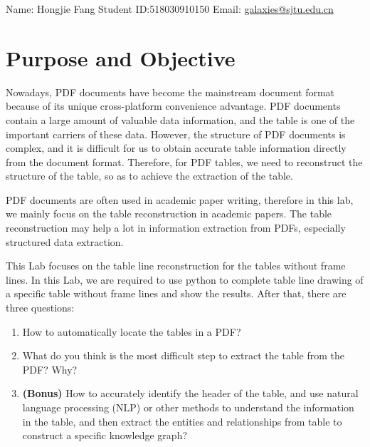 \documentclass[12pt, a4paper]{article}
\theoremstyle{definition}
\begin{document}
\noindent

\noindent{}
\begin{center}

Name: Hongjie Fang  \quad Student ID:518030910150 \quad Email: \href{mailto:galaxies@sjtu.edu.cn}{galaxies@sjtu.edu.cn}
\end{center}

\section{Purpose and Objective}\label{section1}

Nowadays, PDF documents have become the mainstream document format because of its unique cross-platform convenience advantage. PDF documents contain a large amount of valuable data information, and the table is one of the important carriers of these data. However, the structure of PDF documents is complex, and it is difficult for us to obtain accurate table information directly from the document format. Therefore, for PDF tables, we need to reconstruct the structure of the table, so as to achieve the extraction of the table.

PDF documents are often used in academic paper writing, therefore in this lab, we mainly focus on the table reconstruction in academic papers. The table reconstruction may help a lot in information extraction from PDFs, especially structured data extraction. 

This Lab focuses on the table line reconstruction for the tables without frame lines. In this Lab, we are required to use python to complete table line drawing of a specific table without frame lines and show the results. After that, there are three questions:

\begin{enumerate}
	\item How to automatically locate the tables in a PDF?
	\item What do you think is the most difficult step to extract the table from the PDF? Why?
	\item \textbf{(Bonus)} How to accurately identify the header of the table, and use natural language processing (NLP) or other methods to understand the information in the table, and then extract the entities and relationships from table to construct a specific knowledge graph?
\end{enumerate}
\end{document}
